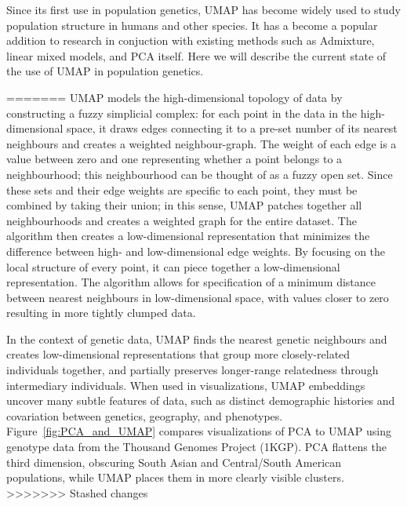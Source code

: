 \documentclass[12pt]{article}
\begin{document}
Since its first use in population genetics, UMAP has become widely used to study population structure in humans and other species. It has a become a popular addition to research in conjuction with existing methods such as Admixture, linear mixed models, and PCA itself. Here we will describe the current state of the use of UMAP in population genetics.

=======
UMAP models the high-dimensional topology of data by constructing a fuzzy simplicial complex: for each point in the data in the high-dimensional space, it draws edges connecting it to a pre-set number of its nearest neighbours and creates a weighted neighbour-graph. The weight of each edge is a value between zero and one representing whether a point belongs to a neighbourhood; this neighbourhood can be thought of as a fuzzy open set. Since these sets and their edge weights are specific to each point, they must be combined by taking their union; in this sense, UMAP patches together all neighbourhoods and creates a weighted graph for the entire dataset. The algorithm then creates a low-dimensional representation that minimizes the difference between high- and low-dimensional edge weights. By focusing on the local structure of every point, it can piece together a low-dimensional representation. The algorithm allows for specification of a minimum distance between nearest neighbours in low-dimensional space, with values closer to zero resulting in more tightly clumped data.

In the context of genetic data, UMAP finds the nearest genetic neighbours and creates low-dimensional representations that group more closely-related individuals together, and partially preserves longer-range relatedness through intermediary individuals. When used in visualizations, UMAP embeddings uncover many subtle features of data, such as distinct demographic histories and covariation between genetics, geography, and phenotypes\cite{diaz-papkovich_umap_2019}. Figure~\ref{fig:PCA_and_UMAP} compares visualizations of PCA to UMAP using genotype data from the Thousand Genomes Project (1KGP)\cite{10002015global}. PCA flattens the third dimension, obscuring South Asian and Central/South American populations, while UMAP places them in more clearly visible clusters.
>>>>>>> Stashed changes
\end{document}
